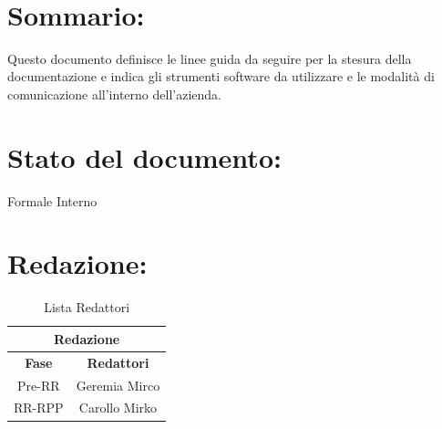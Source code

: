 \newpage
 
\begin{center} %
  \begin{Huge}  
        \textbf{\TITOLODOC}
      \\
  \end{Huge}
\end{center}
 
\section*{\LARGE Sommario:} %
\indent \indent
Questo documento definisce le linee guida da seguire per la stesura della documentazione e indica gli strumenti software da utilizzare e le modalit\`a di comunicazione all'interno dell'azienda.
 
\section*{\LARGE Stato del documento:}
\indent \indent
  Formale Interno
 
\section*{\LARGE Redazione:}
  \begin{table}[!h]
    \begin{center}
      \begin{tabular}
        {|c|c|}
        \hline
        \multicolumn{2}{|c|}{ \textbf{Redazione} } \\
        \hline
        \textbf{Fase} & \textbf{Redattori} \\
        \hline
        {Pre-RR} &Geremia Mirco \\
        \hline
        {RR-RPP} &Carollo Mirko \\
        \hline
      \end{tabular}
      \caption{Lista Redattori} %
      \label{tabredazione}
    \end{center}
  \end{table}
  
